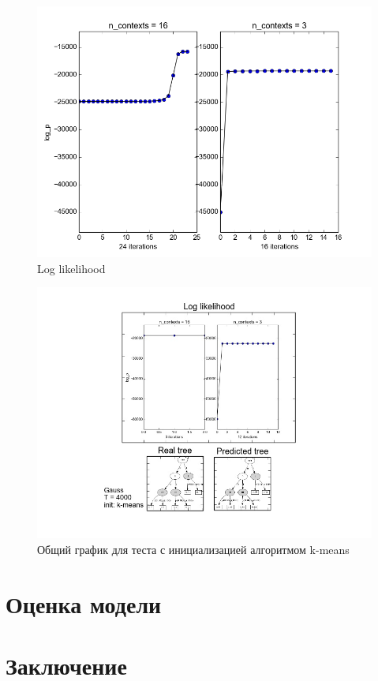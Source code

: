 \documentclass[10pt,a4paper]{article}
\begin{document}
\begin{figure}[hbtp]
\includegraphics[scale=0.4]{img/eq_3676plot_.png}
\centering
\caption{Log likelihood}
\label{ris:img_eq_Gauss_plot}
\end{figure}


\begin{figure}[hbtp]
\includegraphics[scale=0.4]{img/583.jpg}
\centering
\caption{Общий график для теста с инициализацией алгоритмом k-means}
\label{ris:img_Gauss}
\end{figure}

\section{Оценка модели}

\section{Заключение}



\end{document}
